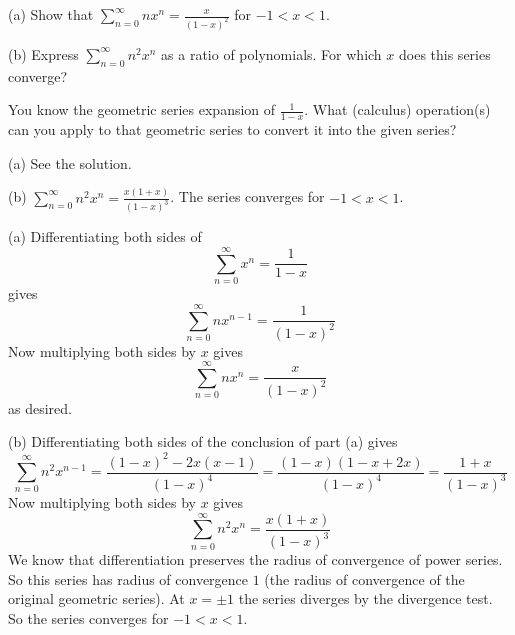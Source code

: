 \begin{question}[2014A]
 (a)  Show that $\displaystyle\sum_{n=0}^\infty nx^n =\frac{x}{(1-x)^2}$
for $-1<x<1$.

\noindent (b) Express $\displaystyle\sum_{n=0}^\infty n^2x^n$ as a
ratio of polynomials. For which $x$ does this series converge?
\end{question}

\begin{hint}
You know the geometric series expansion of $\frac{1}{1-x}$. What (calculus)
operation(s) can you apply to that geometric series to convert it into
the given series?
\end{hint}

\begin{answer}
(a)
See the solution.

\noindent  (b)
$\displaystyle\sum\limits_{n=0}^\infty n^2 x^n=\frac{x(1+x)}{(1-x)^3}$.
The series converges for $-1<x<1$.
\end{answer}

\begin{solution} (a)
Differentiating both sides of
\begin{equation*}
\sum_{n=0}^\infty x^n = \frac{1}{1-x}
\end{equation*}
gives
\begin{equation*}
\sum_{n=0}^\infty n x^{n-1}=\frac{1}{(1-x)^2}
\end{equation*}
Now multiplying both sides by $x$ gives
\begin{equation*}
\sum_{n=0}^\infty n x^n=\frac{x}{(1-x)^2}
\end{equation*}
as desired.


\noindent (b) Differentiating both sides of the conclusion of part (a) gives
\begin{equation*}
\sum_{n=0}^\infty n^2 x^{n-1}=\frac{(1-x)^2-2x(x-1)}{(1-x)^4}
=\frac{(1-x)(1-x+2x)}{(1-x)^4}
=\frac{1+x}{(1-x)^3}
\end{equation*}
Now multiplying both sides by $x$ gives
\begin{equation*}
\sum_{n=0}^\infty n^2 x^n=\frac{x(1+x)}{(1-x)^3}
\end{equation*}
We know that differentiation preserves the radius
of convergence of power series. So this series has radius of
convergence $1$ (the radius of convergence of the original
geometric series). At $x=\pm1 $ the series diverges by the divergence
test. So the series converges for $-1<x<1$.


\end{solution}

